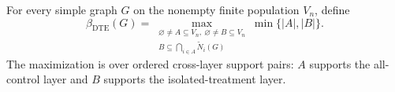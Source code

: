 For every simple graph \(G\) on the nonempty finite population \(V_n\), define
\[
\beta_{\mathrm{DTE}}(G)
=
\max_{\substack{\varnothing\ne A\subseteq V_n,\ \varnothing\ne B\subseteq V_n\\
B\subseteq\bigcap_{i\in A}\widetilde N_i(G)}}
\min\{|A|,|B|\}.
\]
The maximization is over ordered cross-layer support pairs: \(A\) supports the all-control layer and \(B\) supports the isolated-treatment layer.